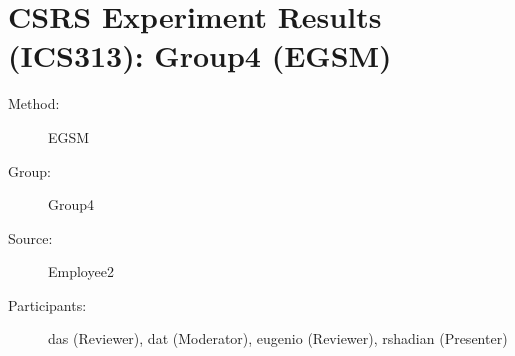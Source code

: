 
%          
	  
\chapter {CSRS Experiment Results (ICS313): Group4 (EGSM)}
\small

\begin{description}
\item [Method:] EGSM
\item [Group:] Group4
\item [Source:] Employee2
\item [Participants:] das (Reviewer), dat (Moderator), eugenio (Reviewer), rshadian (Presenter)
\end{description}

